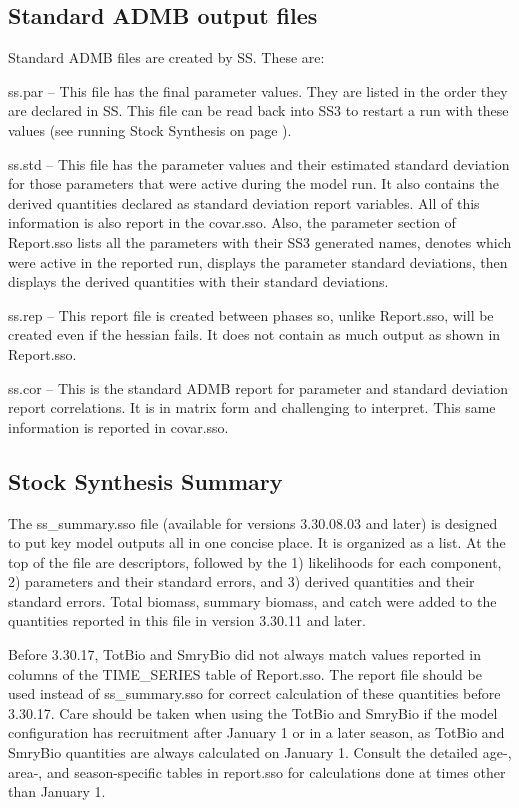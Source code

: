 \subsection{Standard ADMB output files}
Standard ADMB files are created by SS. These are:

ss.par – This file has the final parameter values.  They are listed in the order they are declared in SS.  This file can be read back into SS3 to restart a run with these values (see running Stock Synthesis on page \pageref{sec:RunningSS}).

ss.std – This file has the parameter values and their estimated standard deviation for those parameters that were active during the model run.  It also contains the derived quantities declared as standard deviation report variables.  All of this information is also report in the covar.sso.  Also, the parameter section of Report.sso lists all the parameters with their SS3 generated names, denotes which were active in the reported run, displays the parameter standard deviations, then displays the derived quantities with their standard deviations.

ss.rep – This report file is created between phases so, unlike Report.sso, will be created even if the hessian fails. It does not contain as much output as shown in Report.sso.

ss.cor – This is the standard ADMB report for parameter and standard deviation report correlations. It is in matrix form and challenging to interpret.  This same information is reported in covar.sso.

\subsection{Stock Synthesis Summary}
The ss\_summary.sso file (available for versions 3.30.08.03 and later) is designed to put key model outputs all in one concise place.  It is organized as a list. At the top of the file are descriptors, followed by the 1) likelihoods for each component, 2) parameters and their standard errors, and 3) derived quantities and their standard errors.  Total biomass, summary biomass, and catch were added to the quantities reported in this file in version 3.30.11 and later.

Before 3.30.17, TotBio and SmryBio did not always match values reported in columns of the TIME\_SERIES table of Report.sso. The report file should be used instead of ss\_summary.sso for correct calculation of these quantities before 3.30.17. Care should be taken when using the TotBio and SmryBio if the model configuration has recruitment after January 1 or in a later season, as TotBio and SmryBio quantities are always calculated on January 1. Consult the detailed age-, area-, and season-specific tables in report.sso for calculations done at times other than January 1.


